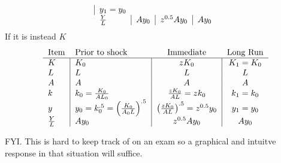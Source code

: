 \documentclass{article}
\begin{document}
\begin{enumerate}
\begin{enumerate}
\begin{equation*}
\begin{tabular}{llcc}
\multicolumn{1}{|c}{$y_{1}=y_{0}$} \\ 
$\frac{Y}{L}$ & \multicolumn{1}{|l}{$Ay_{0}$} & \multicolumn{1}{|c}{$%
z^{0.5}Ay_{0}$} & \multicolumn{1}{|c}{$Ay_{0}$}%
\end{tabular}%
\end{equation*}%
If it is instead $K$ 
\begin{equation*}
\begin{tabular}{llcc}
Item & Prior to shock & Immediate & Long Run \\ \hline
$K$ & \multicolumn{1}{|l}{$K_{0}$} & \multicolumn{1}{|c}{$zK_{0}$} & 
\multicolumn{1}{|c}{$K_{1}=K_{0}$} \\ 
$L$ & \multicolumn{1}{|l}{$L$} & \multicolumn{1}{|c}{$L$} & 
\multicolumn{1}{|c}{$L$} \\ 
$A$ & \multicolumn{1}{|l}{$A$} & \multicolumn{1}{|c}{$A$} & 
\multicolumn{1}{|c}{$A$} \\ 
$k$ & \multicolumn{1}{|l}{$k_{0}=\frac{K_{0}}{AL_{0}}$} & 
\multicolumn{1}{|c}{$\frac{zK_{0}}{AL}=zk_{0}$} & \multicolumn{1}{|c}{$%
k_{1}=k_{0}$} \\ 
$y$ & \multicolumn{1}{|l}{$y_{0}=k_{0}^{.5}=\left( \frac{K_{0}}{A_{0}L}%
\right) ^{.5}$} & \multicolumn{1}{|c}{$\left( \frac{zK_{0}}{AL}\right)
^{.5}=z^{0.5}y_{0}$ } & \multicolumn{1}{|c}{$y_{1}=y_{0}$} \\ 
$\frac{Y}{L}$ & \multicolumn{1}{|l}{$Ay_{0}$} & \multicolumn{1}{|c}{$%
z^{0.5}Ay_{0}$} & \multicolumn{1}{|c}{$Ay_{0}$}%
\end{tabular}%
\end{equation*}

FYI. This is hard to keep track of on an exam so a graphical and intuitve
response in that situation will suffice. 
\end{enumerate}
\end{enumerate}
\end{document}
